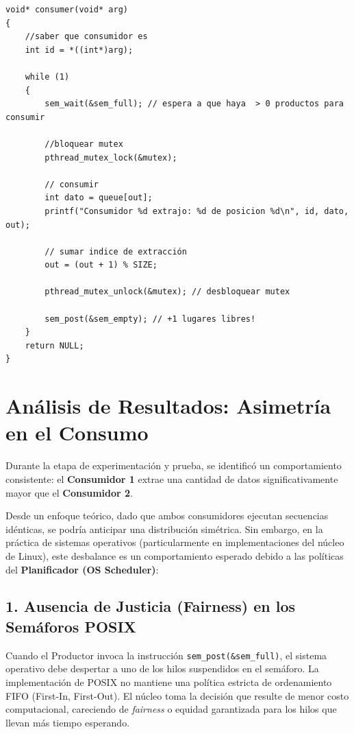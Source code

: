 \documentclass[runningheads]{llncs}
\begin{document}
\begin{lstlisting}[caption={Fragmento de código: Interacción del Mutex y Semáforos}, label={lst:consumidor}]
void* consumer(void* arg)
{
    //saber que consumidor es
    int id = *((int*)arg);

    while (1)
    {
        sem_wait(&sem_full); // espera a que haya  > 0 productos para consumir

        //bloquear mutex
        pthread_mutex_lock(&mutex);

        // consumir
        int dato = queue[out];
        printf("Consumidor %d extrajo: %d de posicion %d\n", id, dato, out);    

        // sumar indice de extracción
        out = (out + 1) % SIZE;

        pthread_mutex_unlock(&mutex); // desbloquear mutex

        sem_post(&sem_empty); // +1 lugares libres!
    }
    return NULL;
}
\end{lstlisting}

\section{Análisis de Resultados: Asimetría en el Consumo}

Durante la etapa de experimentación y prueba, se identificó un comportamiento consistente: el \textbf{Consumidor 1} extrae una cantidad de datos significativamente mayor que el \textbf{Consumidor 2}. 

Desde un enfoque teórico, dado que ambos consumidores ejecutan secuencias idénticas, se podría anticipar una distribución simétrica. Sin embargo, en la práctica de sistemas operativos (particularmente en implementaciones del núcleo de Linux), este desbalance es un comportamiento esperado debido a las políticas del \textbf{Planificador (OS Scheduler)}:

\subsection{1. Ausencia de Justicia (Fairness) en los Semáforos POSIX}
Cuando el Productor invoca la instrucción \texttt{sem\_post(\&sem\_full)}, el sistema operativo debe despertar a uno de los hilos suspendidos en el semáforo. La implementación de POSIX no mantiene una política estricta de ordenamiento FIFO (First-In, First-Out). El núcleo toma la decisión que resulte de menor costo computacional, careciendo de \textit{fairness} o equidad garantizada para los hilos que llevan más tiempo esperando.
\end{document}
